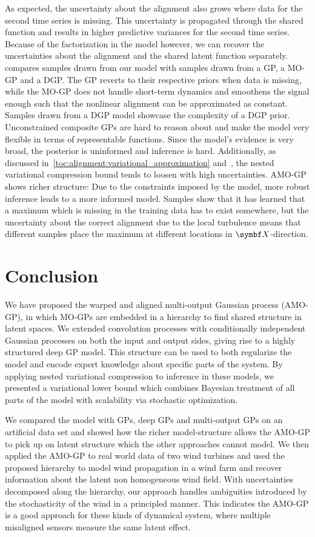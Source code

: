 As expected, the uncertainty about the alignment also grows where data for the second time series is missing.
This uncertainty is propagated through the shared function and results in higher predictive variances for the second time series.
Because of the factorization in the model however, we can recover the uncertainties about the alignment and the shared latent function separately.
 compares samples drawn from our model with samples drawn from a GP, a MO-GP and a DGP.
The GP reverts to their respective priors when data is missing, while the MO-GP does not handle short-term dynamics and smoothens the signal enough such that the nonlinear alignment can be approximated as constant.
Samples drawn from a DGP model showcase the complexity of a DGP prior.
Unconstrained composite GPs are hard to reason about and make the model very flexible in terms of representable functions.
Since the model's evidence is very broad, the posterior is uninformed and inference is hard.
Additionally, as discussed in~\cref{toc:alignment:variational_approximation} and~\parencite{hensman_nested_2014}, the nested variational compression bound tends to loosen with high uncertainties.
AMO-GP shows richer structure:
Due to the constraints imposed by the model, more robust inference leads to a more informed model.
Samples show that it has learned that a maximum which is missing in the training data has to exist somewhere, but the uncertainty about the correct alignment due to the local turbulence means that different samples place the maximum at different locations in $\mat{X}$-direction.


\section{Conclusion}
\label{toc:alignment:conclusion}
We have proposed the warped and aligned multi-output Gaussian process (AMO-GP), in which MO-GPs are embedded in a hierarchy to find shared structure in latent spaces.
We extended convolution processes \parencite{boyle_dependent_2004} with conditionally independent Gaussian processes on both the input and output sides, giving rise to a highly structured deep GP model.
This structure can be used to both regularize the model and encode expert knowledge about specific parts of the system.
By applying nested variational compression \parencite{hensman_nested_2014} to inference in these models, we presented a variational lower bound which combines Bayesian treatment of all parts of the model with scalability via stochastic optimization.

We compared the model with GPs, deep GPs and multi-output GPs on an artificial data set and showed how the richer model-structure allows the AMO-GP to pick up on latent structure which the other approaches cannot model.
We then applied the AMO-GP to real world data of two wind turbines and used the proposed hierarchy to model wind propagation in a wind farm and recover information about the latent non homogeneous wind field.
With uncertainties decomposed along the hierarchy, our approach handles ambiguities introduced by the stochasticity of the wind in a principled manner.
This indicates the AMO-GP is a good approach for these kinds of dynamical system, where multiple misaligned sensors measure the same latent effect.
